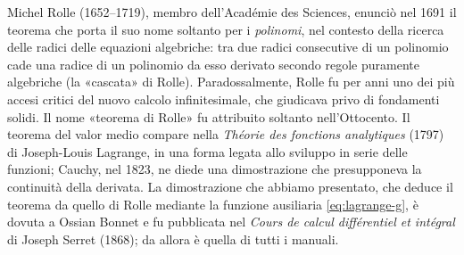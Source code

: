 \begin{notastorica}
Michel Rolle (1652--1719), membro dell'Académie des Sciences, enunciò nel 1691 il
teorema che porta il suo nome soltanto per i \emph{polinomi}, nel contesto della
ricerca delle radici delle equazioni algebriche: tra due radici consecutive di un
polinomio cade una radice di un polinomio da esso derivato secondo regole puramente
algebriche (la «cascata» di Rolle). Paradossalmente, Rolle fu per anni uno dei più
accesi critici del nuovo calcolo infinitesimale, che giudicava privo di fondamenti
solidi. Il nome «teorema di Rolle» fu attribuito soltanto nell'Ottocento. Il teorema
del valor medio compare nella \emph{Théorie des fonctions analytiques} (1797) di
Joseph-Louis Lagrange, in una forma legata allo sviluppo in serie delle funzioni;
Cauchy, nel 1823, ne diede una dimostrazione che presupponeva la continuità della
derivata. La dimostrazione che abbiamo presentato, che deduce il teorema da quello di
Rolle mediante la funzione ausiliaria \eqref{eq:lagrange-g}, è dovuta a Ossian Bonnet e
fu pubblicata nel \emph{Cours de calcul différentiel et intégral} di Joseph Serret
(1868); da allora è quella di tutti i manuali.
\end{notastorica}
